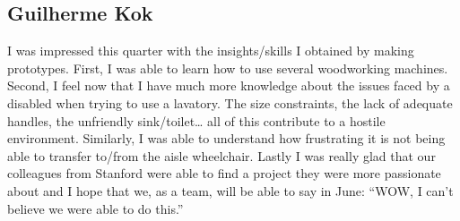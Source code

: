 \subsection{Guilherme Kok}
I was impressed this quarter with the insights/skills I obtained by making prototypes. First, I was able to learn how to use several woodworking machines. Second, I 
feel now that I have much more knowledge about the issues faced by a disabled when trying to use a lavatory. The size constraints, the lack of adequate handles, the unfriendly sink/toilet… all of this contribute to a hostile environment. Similarly, I was able to understand how frustrating it is not being able to transfer to/from the aisle wheelchair. Lastly I was really glad that our colleagues from Stanford were able to find a project they were more passionate about and I hope that we, as a team, will be able to say in June: ``WOW, I can’t believe we were able to do this.'' 

